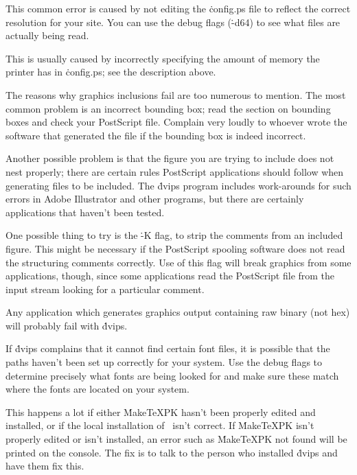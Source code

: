 
This common error is caused by not editing the \.{config.ps} file to
reflect the correct resolution for your site.  You can use the debug flags
(\.{-d64}) to see what files are actually being read.


This is usually caused by incorrectly specifying the amount of memory
the printer has in \.{config.ps}; see the description above.


The reasons why graphics inclusions fail are too numerous to mention.
The most common problem is an incorrect bounding box; read the section
on bounding boxes and check your PostScript file.  Complain very loudly
to whoever wrote the software that generated the file if the bounding
box is indeed incorrect.

Another possible problem is that the figure you are trying to include
does not nest properly; there are certain rules PostScript applications
should follow when generating files to be included.  The \.{dvips}
program includes work-arounds for such errors in Adobe Illustrator and
other programs, but there are certainly applications that haven't
been tested.

One possible thing to try is the \.{-K} flag, to strip the comments from
an included figure.  This might be necessary if the PostScript spooling
software does not read the structuring comments correctly.  Use of this
flag will break graphics from some applications, though, since some
applications read the PostScript file from the input stream looking for
a particular comment.

Any application which generates graphics output containing raw binary
(not hex) will probably fail with \.{dvips}.


If \.{dvips} complains that it cannot find certain font files, it is
possible that the paths haven't been set up correctly for your system.
Use the debug flags to determine precisely what fonts are being looked
for and make sure these match where the fonts are located on your system.


This happens a lot if either \.{MakeTeXPK} hasn't been properly edited
and installed, or if the local installation of \MF\ isn't correct.
If \.{MakeTeXPK} isn't properly edited or isn't installed, an error
such as \.{MakeTeXPK not found} will be printed on the console.  The
fix is to talk to the person who installed \.{dvips} and have them fix
this.

